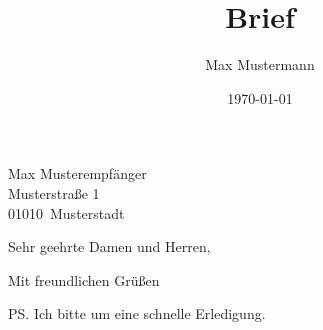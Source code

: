 \documentclass[DIN,draft=false,paper=a4,fontsize=11pt,pagenumber=false,parskip=half,
							backaddress=true,fromalign=right,fromrule=afteraddress,
							fromemail=true,fromurl=false,fromlogo=false,fromphone=true]{scrlttr2}
\title{Brief}
\author{Max Mustermann}
\date{\today}
\begin{document}
\begin{letter}{Max Musterempfänger\\Musterstraße 1\\01010~Musterstadt}

\opening{Sehr geehrte Damen und Herren,}

\blindtext

\closing{Mit freundlichen Grüßen}
\ps{Ich bitte um eine schnelle Erledigung.}

\end{letter}
\end{document}
